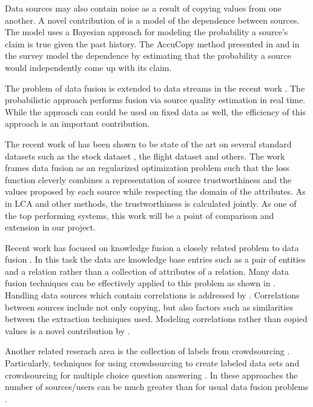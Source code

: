 \documentclass{acm_proc_article-sp}
\begin{document}
Data sources may also contain noise as a result of copying values from one another. A novel contribution of \cite{dong:integrating} is a model of the dependence between sources. The model uses a Bayesian approach for modeling the probability a source's claim is true given the past history. The {\sc AccuCopy} method presented in \cite{dong:integrating} and in the survey \cite{li:truth} model the dependence by estimating that the probability a source would independently come up with its claim. 

The problem of data fusion is extended to data streams in the recent work \cite{zhao:truth}. The probabilistic approach performs fusion via source quality estimation in real time. While the approach can could be used on fixed data as well, the efficiency of this approach is an important contribution. 

The recent work of \cite{li:resolving} has been shown to be state of the art on several standard datasets such as the stock dataset \cite{li:truth}, the flight dataset \cite{li:truth} and others. The work frames data fusion as an regularized optimization problem such that the loss function cleverly combines a representation of source trustworthiness and the values proposed by each source while respecting the domain of the attributes. As in LCA and other methods, the trustworthiness is calculated jointly. As one of the top performing systems, this work will be a point of comparison and extension in our project. 

Recent work has focused on knowledge fusion a closely related problem to data fusion \cite{dong:data}\cite{pochampally:fusing} \cite{yu:wisdom}.  In this task the data are knowledge base entries such as a pair of entities and a relation rather than a collection of attributes of a relation. Many data fusion techniques can be effectively applied to this problem as shown in \cite{dong:data}. Handling data sources which contain correlations is addressed by \cite{pochampally:fusing}. Correlations between sources include not only copying, but also factors such as similarities between the extraction techniques used. Modeling correlations rather than copied values is a novel contribution by  \cite{pochampally:fusing}.


Another related reserach area is the collection of labels from crowdsourcing \cite{nguyen:minimizing}. Particularly, techniques for using crowdsourcing to create labeled data sets \cite{sheng:get} \cite{nguyen:minimizing} and crowdsourcing for multiple choice question answering \cite{bachrach:grade}. In these approaches the number of sources/users can be much greater than for usual data fusion problems \cite{li:truth} \cite{nguyen:minimizing}.
\end{document}
